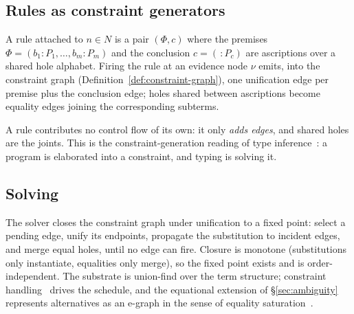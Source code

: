 \subsection{Rules as constraint generators}

\begin{definition}[Rule]
  \label{def:rule}
  A rule attached to $n \in N$ is a pair $(\Phi, c)$ where the premises
  $\Phi = (b_1 : P_1, \dots, b_m : P_m)$ and the conclusion $c = (\,:\!P_c)$ are
  ascriptions over a shared hole alphabet. Firing the rule at an evidence node
  $\nu$ emits, into the constraint graph
  (Definition~\ref{def:constraint-graph}), one unification edge per premise plus
  the conclusion edge; holes shared between ascriptions become equality edges
  joining the corresponding subterms.
\end{definition}

A rule contributes no control flow of its own: it only \emph{adds edges}, and
shared holes are the joints. This is the constraint-generation reading of type
inference~\cite{PottierRemy2005}: a program is elaborated into a constraint, and
typing is solving it.

\subsection{Solving}

\begin{definition}[Solve]
  \label{def:solve}
  The solver closes the constraint graph under unification to a fixed point:
  select a pending edge, unify its endpoints, propagate the substitution to
  incident edges, and merge equal holes, until no edge can fire. Closure is
  monotone (substitutions only instantiate, equalities only merge), so the fixed
  point exists and is order-independent. The substrate is union-find over the
  term structure; constraint handling~\cite{Sneyers2009} drives the schedule, and
  the equational extension of \S\ref{sec:ambiguity} represents alternatives as an
  e-graph in the sense of equality saturation~\cite{Willsey2021}.
\end{definition}

